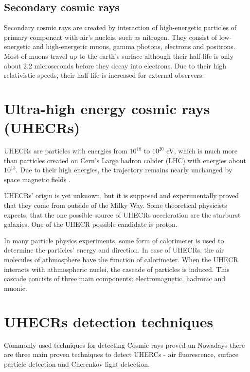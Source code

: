 \subsection{Secondary cosmic rays}
Secondary cosmic rays are created by interaction of high-energetic particles of primary component with air's nucleis, such as nitrogen. They consist of low-energetic and high-energetic muons, gamma photons, electrons and positrons. Most of muons travel up to the earth's surface although their half-life is only about 2.2 microseconds before they decay into electrons. Due to their high relativistic speeds, their half-life is increased for external observers. 




\section{Ultra-high energy cosmic rays (UHECRs)}
UHECRs are particles with energies from $10^{18}$ to $10^{20}$ eV, which is much more than particles created on Cern's Large hadron colider (LHC) with energies about $10^{13}$. Due to their high energies, the trajectory remains nearly unchanged by space magnetic fields \cite{Benjamin_Skuse}.
\par
UHECRs' origin is yet unknown, but it is supposed and experimentally proved that they come from outside of the Milky Way. Some theoretical physicists expects, that the one possible source of UHECRs acceleration are the starburst galaxies. One of the UHECR possible candidate is proton. 
\par
In many particle physics experiments, some form of calorimeter is used to determine the particles' energy and direction. In case of UHECRs, the air molecules of athmosphere have the function of calorimeter.
When the UHECR interacts with athmospheric nuclei, the cascade of particles is induced. This cascade concists of three main components: electromagnetic, hadronic and muonic.
\par




\section{UHECRs detection techniques}
Commonly used techniques for detecting Cosmic rays proved un
Nowadays there are three main proven techniques to detect UHERCs - 
air fluorescence, surface particle detection and Cherenkov light detection.

